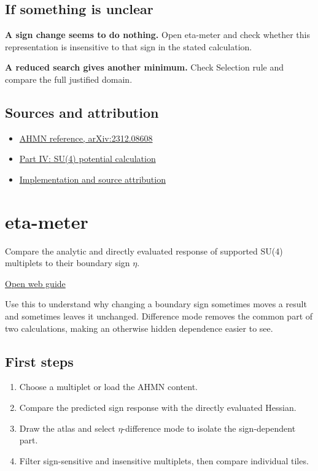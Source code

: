 \documentclass[11pt,a4paper]{article}
\begin{document}
\subsection*{If something is unclear}
\textbf{A sign change seems to do nothing.} Open eta-meter and check whether this representation is insensitive to that sign in the stated calculation.

\textbf{A reduced search gives another minimum.} Check Selection rule and compare the full justified domain.

\subsection*{Sources and attribution}
\begin{itemize}
\item \href{https://arxiv.org/abs/2312.08608}{AHMN reference, arXiv:2312.08608}
\item \href{https://karlesmarin.github.io/ghu-explorer/papers/part-iv/index.html}{Part IV: SU(4) potential calculation}
\item \href{https://github.com/karlesmarin/ghu-lab/blob/main/src/sections/calculator_section.js}{Implementation and source attribution}
\end{itemize}
\section{eta-meter}
Compare the analytic and directly evaluated response of supported SU(4) multiplets to their boundary sign \ensuremath{\eta}.

\href{https://karlesmarin.github.io/ghu-explorer/guide/eta/index.html}{Open web guide}

Use this to understand why changing a boundary sign sometimes moves a result and sometimes leaves it unchanged. Difference mode removes the common part of two calculations, making an otherwise hidden dependence easier to see.
\subsection*{First steps}
\begin{enumerate}
\item Choose a multiplet or load the AHMN content.
\item Compare the predicted sign response with the directly evaluated Hessian.
\item Draw the atlas and select \ensuremath{\eta}-difference mode to isolate the sign-dependent part.
\item Filter sign-sensitive and insensitive multiplets, then compare individual tiles.
\end{enumerate}
\end{document}
